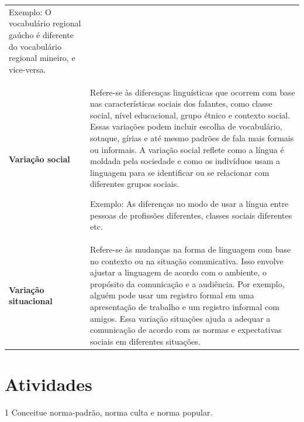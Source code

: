 \begin{longtable}[]{@{}ll@{}}
\begin{minipage}[t]{0.46\columnwidth}
Exemplo: O vocabulário regional gaúcho é diferente do vocabulário
regional mineiro, e vice-versa.\strut
\end{minipage}\tabularnewline
\begin{minipage}[t]{0.46\columnwidth}\raggedright
\textbf{Variação social}\strut
\end{minipage} & \begin{minipage}[t]{0.46\columnwidth}\raggedright
Refere-se às diferenças linguísticas que ocorrem com base nas características sociais dos falantes, como classe social, nível educacional, grupo étnico e contexto social. Essas variações podem incluir escolha de vocabulário, sotaque, gírias e até mesmo padrões de fala mais formais ou informais. A variação social reflete como a língua é moldada pela sociedade e como os indivíduos usam a linguagem para se identificar ou se relacionar com diferentes grupos sociais.

Exemplo: As diferenças no modo de usar a língua entre pessoas de profissões diferentes, classes sociais diferentes etc.\strut
\end{minipage}\tabularnewline
\begin{minipage}[t]{0.46\columnwidth}\raggedright
\textbf{Variação situacional}\strut
\end{minipage} & \begin{minipage}[t]{0.46\columnwidth}\raggedright
Refere-se às mudanças na forma de linguagem com base no contexto ou na situação comunicativa. Isso envolve ajustar a linguagem de acordo com o ambiente, o propósito da comunicação e a audiência. Por exemplo, alguém pode usar um registro formal em uma apresentação de trabalho e um registro informal com amigos. Essa variação situações ajuda a adequar a comunicação de acordo com as normas e expectativas sociais em diferentes situações.\strut
\end{minipage}\tabularnewline
\bottomrule
\end{longtable}

\section*{Atividades}


\num{1} Conceitue norma-padrão, norma culta e norma popular.


